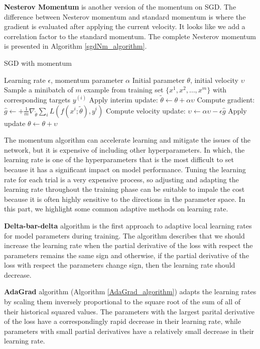 \textbf{Nesterov Momentum} is another version of the momentum on SGD. The difference between Nesterov momentum and standard momentum is where the gradient is evaluated after applying the current velocity. It looks like we add a correlation factor to the standard momentum. The complete Nesterov momentum is presented in Algorithm \ref{sgdNm_algorithm}.

\begin{algorithm}
	\caption{SGD with momentum}
	\label{sgdNm_algorithm}
	\begin{algorithmic}
		\REQUIRE Learning rate $\epsilon$, momentum parameter $\alpha$
		\REQUIRE Initial parameter $\theta$, initial velocity $\upsilon$
			\STATE Sample a minibatch of $m$ example from training set $\{ x^1,x^2,\ldots, x^m \}$ with corresponding targets $y^{(i)}$
			\STATE Apply interim update: $\tilde{\theta} \leftarrow \theta + \alpha \upsilon$
			\STATE Compute gradient: $\hat{g} \leftarrow + \frac{1}{m} \nabla_{\tilde{\theta}} \sum_i L(f(x^i;\tilde{\theta}), y^i) $
			\STATE Compute velocity update: $\upsilon \leftarrow \alpha \upsilon - \epsilon \hat{g} $
			\STATE Apply update $\theta \leftarrow \theta + \upsilon$
		\ENDWHILE
	\end{algorithmic}
\end{algorithm}

The momentum algorithm can accelerate learning and mitigate the issues of the network, but it is expensive of including other hyperparameters. In which, the learning rate is one of the hyperparameters that is the most difficult to set because it has a significant impact on model performance. Tuning the learning rate for each trial is a very expensive process, so adjusting and adapting the learning rate throughout the training phase can be suitable to impale the cost because it is often highly sensitive to the directions in the parameter space. In this part, we highlight some common adaptive methods on learning rate.

\textbf{Delta-bar-delta} algorithm \cite{} is the first approach to adaptive local learning rates for model parameters during training. The algorithm describes that we should increase the learning rate when the partial derivative of the loss with respect the parameters remains the same sign and otherwise, if the partial derivative of the loss with respect the parameters change sign, then the learning rate should decrease. 

\textbf{AdaGrad} algorithm (Algorithm \ref{AdaGrad_algorithm}) adapts the learning rates by scaling them inversely proportional to the square root of the sum of all of their historical squared values. The parameters with the largest parital derivative of the loss have a correspondingly rapid decrease in their learning rate, while parameters with small partial derivatives have a relatively small decrease in their learning rate.

